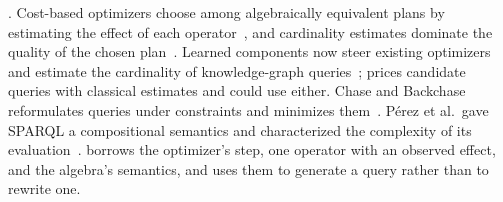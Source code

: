 .
Cost-based optimizers choose among algebraically equivalent plans by
estimating the effect of each operator~\cite{selinger1979access}, and
cardinality estimates dominate the quality of the chosen
plan~\cite{leis2015good}.
Learned components now steer existing optimizers~\cite{marcus2021bao}
and estimate the cardinality of knowledge-graph
queries~\cite{davitkova2022lmkg,schwabe2024gnce}; \hermes prices
candidate queries with classical estimates and could use either.
Chase and Backchase reformulates queries under constraints and
minimizes them~\cite{deutsch1999chase}.
Pérez et al.\ gave SPARQL a compositional semantics and characterized
the complexity of its evaluation~\cite{perez2009semantics}.
\hermes borrows the optimizer's step, one operator with an observed
effect, and the algebra's semantics, and uses them to generate a query
rather than to rewrite one.
